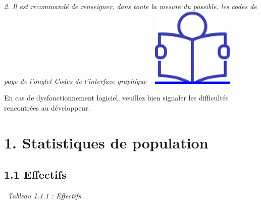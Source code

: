 \emph{2. Il est recommandé de renseigner, dans toute la mesure du
possible, les codes de paye de l'onglet Codes de l'interface graphique}
~
\href{../Docs/Notices/fiche_onglet_codes.odt}{\includegraphics{icones/Notice.png}}

En cas de dysfonctionnement logiciel, veuillez bien signaler les
difficultés rencontrées au développeur.

\hypertarget{statistiques-de-population}{%
\section{1. Statistiques de
population}\label{statistiques-de-population}}

\hypertarget{effectifs}{%
\subsection{1.1 Effectifs}\label{effectifs}}

~\emph{Tableau 1.1.1 : Effectifs}

